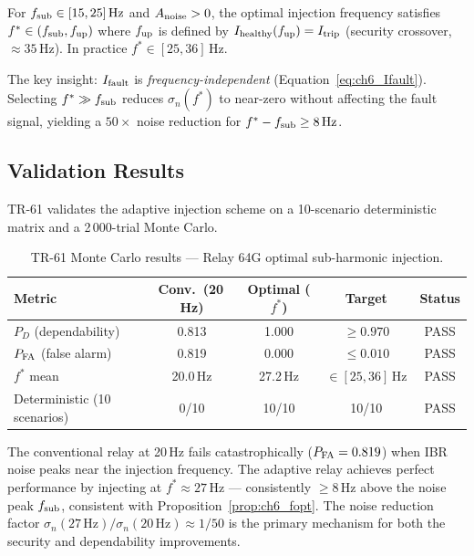 \begin{proposition}
  \label{prop:ch6_fopt}
  For $f_{\rm sub} \in [15, 25]\,\text{Hz}$ and $A_{\rm noise} > 0$, the optimal
  injection frequency satisfies $f^* \in (f_{\rm sub}, f_{\rm up})$ where
  $f_{\rm up}$ is defined by $I_{\rm healthy}(f_{\rm up}) = I_{\rm trip}$
  (security crossover, $\approx 35\,\text{Hz}$).  In practice $f^* \in [25, 36]\,\text{Hz}$.
\end{proposition}

\noindent
The key insight: $I_{\rm fault}$ is \emph{frequency-independent}
(Equation~\eqref{eq:ch6_Ifault}).  Selecting $f^* \gg f_{\rm sub}$ reduces
$\sigma_n(f^*)$ to near-zero without affecting the fault signal, yielding a
$50\times$ noise reduction for $f^* - f_{\rm sub} \geq 8\,\text{Hz}$.

\subsection{Validation Results}
\label{sec:ch6_64g_results}

TR-61 validates the adaptive injection scheme on a 10-scenario deterministic
matrix and a 2\,000-trial Monte Carlo.

\begin{table}[h]
  \centering
  \caption{TR-61 Monte Carlo results — Relay 64G optimal sub-harmonic injection.}
  \label{tab:ch6_64g_mc}
  \small
  \begin{tabular}{lcccc}
    \toprule
    Metric & Conv.\ (20\,Hz) & Optimal ($f^*$) & Target & Status \\
    \midrule
    $P_D$ (dependability) & 0.813 & 1.000 & $\geq 0.970$ & PASS \\
    $P_{\rm FA}$ (false alarm) & 0.819 & 0.000 & $\leq 0.010$ & PASS \\
    $f^*$ mean & 20.0\,Hz & 27.2\,Hz & $\in [25,36]\,\text{Hz}$ & PASS \\
    Deterministic (10 scenarios) & 0/10 & 10/10 & 10/10 & PASS \\
    \bottomrule
  \end{tabular}
\end{table}

The conventional relay at 20\,Hz fails catastrophically ($P_{\rm FA} = 0.819$)
when IBR noise peaks near the injection frequency.
The adaptive relay achieves perfect performance by injecting at
$f^* \approx 27\,\text{Hz}$ — consistently $\geq 8\,\text{Hz}$ above the
noise peak $f_{\rm sub}$, consistent with Proposition~\ref{prop:ch6_fopt}.
The noise reduction factor $\sigma_n(27\,\text{Hz})/\sigma_n(20\,\text{Hz})
\approx 1/50$ is the primary mechanism for both the security and dependability
improvements.

